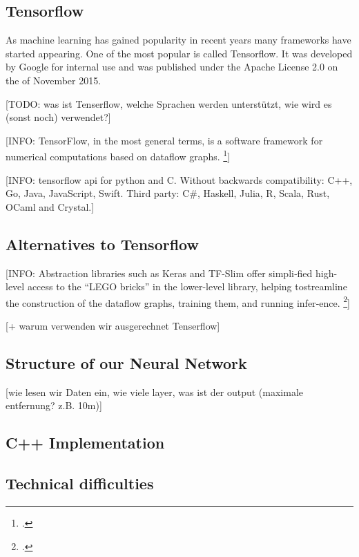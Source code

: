 \subsection{Tensorflow}
As machine learning has gained popularity in recent years many frameworks have started appearing. One of the most popular is called Tensorflow. It was developed by Google for internal use and was published under the Apache License 2.0 on the  of November 2015.

[TODO: was ist Tenserflow, welche Sprachen werden unterstützt, wie wird es (sonst noch) verwendet?]

[INFO: TensorFlow,  in  the  most  general  terms,  is  a  software  framework  for  numerical  computations based on dataflow graphs. \footcite[page ]{Hope_Learning_TensorFlow}]

[INFO: tensorflow api for python and C. Without backwards compatibility: C++, Go, Java, JavaScript, Swift. Third party: C\#, Haskell, Julia, R, Scala, Rust, OCaml and Crystal.]

\subsection{Alternatives to Tensorflow}

[INFO: Abstraction libraries such as Keras and TF-Slim offer simpli‐fied  high-level  access  to  the  “LEGO  bricks”  in  the  lower-level  library,  helping  tostreamline the construction of the dataflow graphs, training them, and running infer‐ence. \footcite[page 7]{Hope_Learning_TensorFlow}]

[+ warum verwenden wir ausgerechnet Tenserflow]

\subsection{Structure of our Neural Network}

[wie lesen wir Daten ein, wie viele layer, was ist der output (maximale entfernung? z.B. 10m)]

\subsection{C++ Implementation}

\subsection{Technical difficulties}

\filbreak